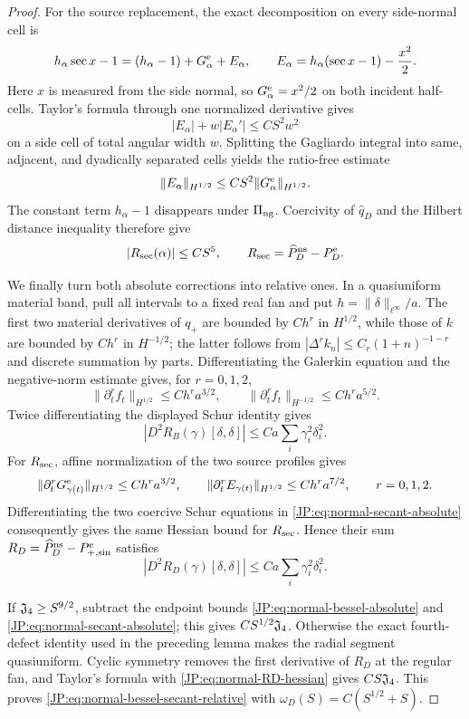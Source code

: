 \begin{proof}
For the source replacement, the exact decomposition on every side-normal
cell is
\[
 h_\alpha\sec x-1=(h_\alpha-1)+G_\alpha^{\rm e}+E_\alpha,
 \qquad E_\alpha=h_\alpha(\sec x-1)-\frac{x^2}{2}.
\]
Here $x$ is measured from the side normal, so $G_\alpha^{\rm e}=x^2/2$
on both incident half-cells.  Taylor's formula through one normalized
derivative gives
\[
 |E_\alpha|+w|E_\alpha'|\le CS^2w^2
\]
on a side cell of total angular width $w$.  Splitting the Gagliardo
integral into same, adjacent, and dyadically separated cells yields the
ratio-free estimate
\begin{equation}\label{JP:eq:normal-secant-remainder}
 \|E_\alpha\|_{H^{1/2}}
 \le CS^2\|G_\alpha^{\rm e}\|_{H^{1/2}}.
\end{equation}
The constant term $h_\alpha-1$ disappears under $\Pi_{\rm ng}$.
Coercivity of $\widehat q_D$ and the Hilbert distance inequality therefore
give
\begin{equation}\label{JP:eq:normal-secant-absolute}
 |R_{\rm sec}(\alpha)|\le CS^5,
 \qquad R_{\rm sec}=\widehat P_D^{\rm ns}-P_D^{\rm e}.
\end{equation}

We finally turn both absolute corrections into relative ones.  In a
quasiuniform material band, pull all intervals to a fixed real fan and put
$h=\|\delta\|_{\ell^\infty}/a$.  The first two material derivatives of
$q_+$ are bounded by $Ch^r$ in $H^{1/2}$, while those of $k$ are bounded by
$Ch^r$ in $H^{-1/2}$; the latter follows from
$|\Delta^rk_n|\le C_r(1+n)^{-1-r}$ and discrete summation by parts.
Differentiating the Galerkin equation and the negative-norm estimate gives,
for $r=0,1,2$,
\[
 \|\partial_t^rf_t\|_{H^{1/2}}\le Ch^ra^{3/2},
 \qquad
 \|\partial_t^rf_t\|_{H^{-1/2}}\le Ch^ra^{5/2}.
\]
Twice differentiating the displayed Schur identity gives
\[
 |D^2R_B(\gamma)[\delta,\delta]|
 \le Ca\sum_i\gamma_i^2\delta_i^2.
\]
For $R_{\rm sec}$, affine normalization of the two source profiles gives
\[
 \|\partial_t^rG_{\gamma(t)}^{\rm e}\|_{H^{1/2}}
 \le Ch^ra^{3/2},\qquad
 \|\partial_t^rE_{\gamma(t)}\|_{H^{1/2}}
 \le Ch^ra^{7/2},\qquad r=0,1,2.
\]
Differentiating the two coercive Schur equations in
\eqref{JP:eq:normal-secant-absolute} consequently gives the same Hessian
bound for $R_{\rm sec}$.  Hence their sum
$R_D=\widehat P_D^{\rm ns}-P_{+,\sin}^{\rm e}$ satisfies
\begin{equation}\label{JP:eq:normal-RD-hessian}
 |D^2R_D(\gamma)[\delta,\delta]|
 \le Ca\sum_i\gamma_i^2\delta_i^2.
\end{equation}

If $\mathfrak J_4\ge S^{9/2}$, subtract the endpoint bounds
\eqref{JP:eq:normal-bessel-absolute} and
\eqref{JP:eq:normal-secant-absolute}; this gives
$CS^{1/2}\mathfrak J_4$.  Otherwise the exact fourth-defect identity used in the
preceding lemma makes the radial segment quasiuniform.  Cyclic symmetry
removes the first derivative of $R_D$ at the regular fan, and Taylor's
formula with \eqref{JP:eq:normal-RD-hessian} gives $CS\mathfrak J_4$.  This proves
\eqref{JP:eq:normal-bessel-secant-relative} with
$\omega_D(S)=C(S^{1/2}+S)$.
\end{proof}


